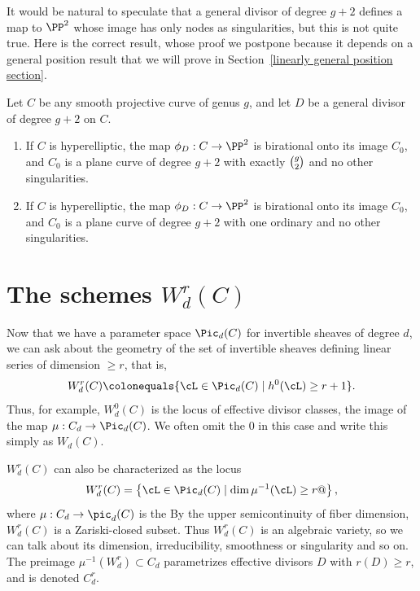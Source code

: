 It would be natural to speculate that a general divisor of degree $g+2$ defines a map to $\PP^2$ whose
image has only nodes as singularities, but this is not quite true. Here is the correct result,
whose proof we postpone 
because it depends on a general position result that 
we will prove in Section~\ref{linearly general position section}.

\begin{theorem}[$g+2$ theorem]\label{g+2 theorem}
Let $C$ be any smooth projective curve of genus $g$, and let $D$ be a general divisor of degree $g+2$ on $C$. 
%
\begin{enumerate}
\item If $C$ is 
hyperelliptic, the map $\phi_D : C \to \PP^2$ is birational onto its
image $C_0$, and $C_0$ is a plane curve of degree $g+2$ with exactly
$\tbinom{g}{2}$ 
%
and no other singularities.
\item If $C$ is hyperelliptic, the map $\phi_D : C \to \PP^2$ is
  birational onto its image $C_0$, and $C_0$ is a plane curve of
  degree $g+2$ with one ordinary 
%
 and no other
  singularities. 
\end{enumerate}
\end{theorem}

\section{The schemes $W^r_d(C)$}

Now that we have a parameter space $\Pic_d(C)$ for invertible sheaves
%
of degree $d$, we can ask about the geometry of the set of invertible
sheaves defining linear series of dimension $\geq r$, that is,
%
$$
W^r_d(C) \colonequals \{ \cL \in \Pic_d(C) \mid h^0(\cL) \geq r+1 \}.
$$
Thus, for example, $W^0_d(C)$ is the locus of effective divisor
classes, the image of the map $\mu : C_d \to \Pic_d(C)$. We often omit
the 0 in this case and write this simply as $W_d(C)$.

$W^r_d(C)$ can also be characterized as the locus
$$
W^r_d(C)= \left\{ \cL \in \Pic_d(C) \mid {\dim \mu^{-1}(\cL)} \geq r @\right\},
$$
where $\mu : C_d \to \pic_d(C)$ is the 
%
By the upper semicontinuity of fiber dimension, 
$W^r_d(C)$ is a Zariski-closed subset.
Thus $W^r_d(C)$ is an algebraic variety, so we can talk about its dimension, irreducibility, smoothness or singularity and so on. The preimage $\mu^{-1}(W^r_d) \subset C_d$ parametrizes effective divisors $D$ with $r(D) \geq r$, and is denoted $C^r_d$.
%

